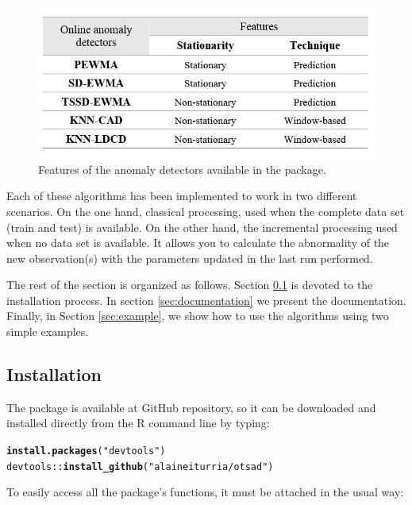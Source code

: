 \documentclass[a4paper]{article}\usepackage[]{graphicx}\usepackage[]{color}
\makeatletter
\newcommand{\hlstr}[1]{\textcolor[rgb]{0.192,0.494,0.8}{#1}}%
\newcommand{\hlopt}[1]{\textcolor[rgb]{0,0,0}{#1}}%
\newcommand{\hlstd}[1]{\textcolor[rgb]{0.345,0.345,0.345}{#1}}%
\newcommand{\hlkwd}[1]{\textcolor[rgb]{0.737,0.353,0.396}{\textbf{#1}}}%
\newenvironment{kframe}{%
 \def\at@end@of@kframe{}%
 \ifinner\ifhmode%
  \def\at@end@of@kframe{\end{minipage}}%
  \begin{minipage}{\columnwidth}%
 \fi\fi%
 \def\FrameCommand##1{\hskip\@totalleftmargin \hskip-\fboxsep
 \colorbox{shadecolor}{##1}\hskip-\fboxsep
     \hskip-\linewidth \hskip-\@totalleftmargin \hskip\columnwidth}%
 \MakeFramed {\advance\hsize-\width
   \@totalleftmargin\z@ \linewidth\hsize
   \@setminipage}}%
 {\par\unskip\endMakeFramed%
 \at@end@of@kframe}
\newenvironment{knitrout}{}{} %
\makeatother
\begin{document}
\begin{figure}[htbp]
\centering
\includegraphics[width=0.7\linewidth]{features.PNG}
\caption{Features of the anomaly detectors available in the  package.}
\label{fig:features}
\end{figure}

Each of these algorithms has been implemented to work in two different scenarios. On the one hand, classical processing, used when the complete data set (train and test) is available. On the other hand, the incremental processing used when no data set is available. It allows you to calculate the abnormality of the new observation(s) with the parameters updated in the last run performed.

The rest of the section is organized as follows. Section \ref{sec:installation} is devoted to the installation process. In section \ref{sec:documentation} we present the documentation. Finally, in Section \ref{sec:example}, we show how to use the algorithms using two simple examples.

\subsection{Installation}\label{sec:installation}

The  package is available at GitHub repository, so it can be downloaded and installed directly from the R command line by typing:

\begin{knitrout}
\color{fgcolor}\begin{kframe}
\begin{alltt}
\hlkwd{install.packages}\hlstd{(}\hlstr{"devtools"}\hlstd{)}
\hlstd{devtools}\hlopt{::}\hlkwd{install_github}\hlstd{(}\hlstr{"alaineiturria/otsad"}\hlstd{)}
\end{alltt}
\end{kframe}
\end{knitrout}

To easily access all the package’s functions, it must be attached in the usual way:
\end{document}

